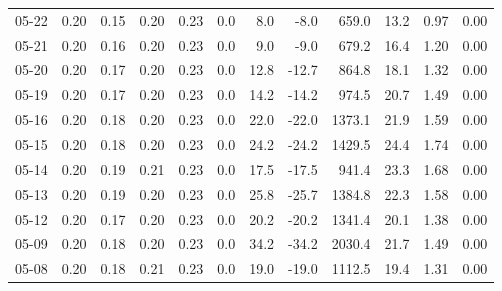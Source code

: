 \begin{threeparttable}
{\begin{tabular}{lrrrrrrrrrrr}
  05-22 &          0.20 &          0.15 &          0.20 &        0.23 &                 0.0 &                 8.0 &       -8.0 &               659.0 &             13.2 &            0.97 &                   0.00 \\
  05-21 &          0.20 &          0.16 &          0.20 &        0.23 &                 0.0 &                 9.0 &       -9.0 &               679.2 &             16.4 &            1.20 &                   0.00 \\
  05-20 &          0.20 &          0.17 &          0.20 &        0.23 &                 0.0 &                12.8 &      -12.7 &               864.8 &             18.1 &            1.32 &                   0.00 \\
  05-19 &          0.20 &          0.17 &          0.20 &        0.23 &                 0.0 &                14.2 &      -14.2 &               974.5 &             20.7 &            1.49 &                   0.00 \\
  05-16 &          0.20 &          0.18 &          0.20 &        0.23 &                 0.0 &                22.0 &      -22.0 &              1373.1 &             21.9 &            1.59 &                   0.00 \\
  05-15 &          0.20 &          0.18 &          0.20 &        0.23 &                 0.0 &                24.2 &      -24.2 &              1429.5 &             24.4 &            1.74 &                   0.00 \\
  05-14 &          0.20 &          0.19 &          0.21 &        0.23 &                 0.0 &                17.5 &      -17.5 &               941.4 &             23.3 &            1.68 &                   0.00 \\
  05-13 &          0.20 &          0.19 &          0.20 &        0.23 &                 0.0 &                25.8 &      -25.7 &              1384.8 &             22.3 &            1.58 &                   0.00 \\
  05-12 &          0.20 &          0.17 &          0.20 &        0.23 &                 0.0 &                20.2 &      -20.2 &              1341.4 &             20.1 &            1.38 &                   0.00 \\
  05-09 &          0.20 &          0.18 &          0.20 &        0.23 &                 0.0 &                34.2 &      -34.2 &              2030.4 &             21.7 &            1.49 &                   0.00 \\
  05-08 &          0.20 &          0.18 &          0.21 &        0.23 &                 0.0 &                19.0 &      -19.0 &              1112.5 &             19.4 &            1.31 &                   0.00 \\

\end{tabular}}
\end{threeparttable}
